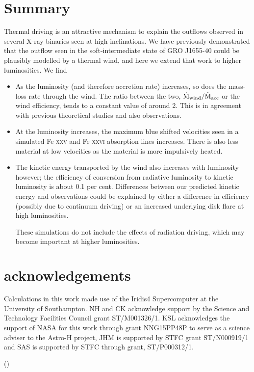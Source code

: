 \documentclass[a4paper,fleqn,usenatbib]{mnras}
\begin{document}
\section{Summary }

Thermal driving is an attractive mechanism to explain the outflows observed in several 
X-ray binaries seen at high inclinations. We have previously demonstrated that 
the outflow seen in the soft-intermediate state of GRO J1655-40 could be plausibly 
modelled by a thermal wind, and here we extend that work to higher luminosities. We find

\begin{itemize}
\item{As the luminosity (and therefore accretion rate) increases, so does the mass-loss rate through the wind. 
The ratio between the two, $\dot{\rm{M}}_{\rm{wind}}/\dot{\rm{M}}_{\rm{acc}}$ or the wind efficiency,
tends to a constant value of around 2. This is in agreement with previous theoretical studies and 
also observations.}
\item{At the luminosity increases, the maximum blue shifted velocities seen in a simulated 
Fe \textsc{xxv} and Fe \textsc{xxvi} absorption lines increases. There is also less material at low 
velocities as the material is more impulsively heated.}
\item{The kinetic energy transported by the wind also increases with luminosity however; the efficiency of conversion from radiative luminosity to kinetic 
luminosity is about 0.1 per cent. Differences between our predicted kinetic energy and observations could be explained
by either a difference in efficiency (possibly due to continuum driving) or an increased underlying disk flare at high
luminosities.}

These simulations do not include the effects of radiation driving, which may become
important at higher luminosities. 



\end{itemize}

\section{acknowledgements}
Calculations in this work made use of the Iridis4 Supercomputer at the University of Southampton.
NH and CK  acknowledge support by the Science and Technology Facilities Council grant ST/M001326/1. 
KSL acknowledges the support of NASA for this work through grant NNG15PP48P to serve as a 
science adviser to the Astro-H project, JHM is supported by STFC grant ST/N000919/1 and SAS 
is supported by STFC through grant, ST/P000312/1. 




()
\label{lastpage}

\bsp	%
\end{document}
